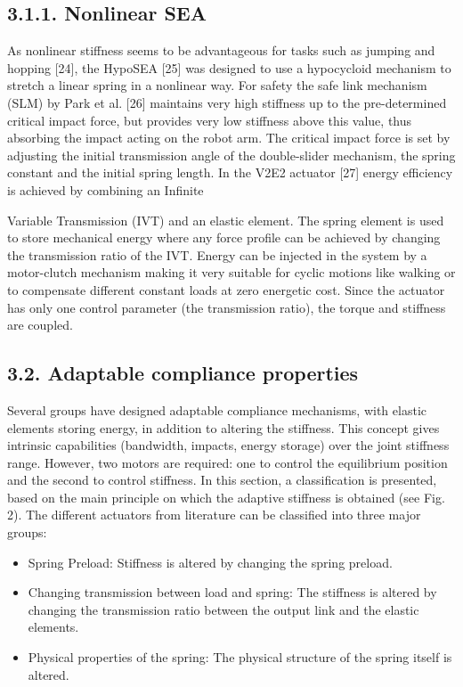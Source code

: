 \documentclass[10pt]{article}
\begin{document}
\subsection*{3.1.1. Nonlinear SEA}
As nonlinear stiffness seems to be advantageous for tasks such as jumping and hopping [24], the HypoSEA [25] was designed to use a hypocycloid mechanism to stretch a linear spring in a nonlinear way. For safety the safe link mechanism (SLM) by Park et al. [26] maintains very high stiffness up to the pre-determined critical impact force, but provides very low stiffness above this value, thus absorbing the impact acting on the robot arm. The critical impact force is set by adjusting the initial transmission angle of the double-slider mechanism, the spring constant and the initial spring length. In the V2E2 actuator [27] energy efficiency is achieved by combining an Infinite

Variable Transmission (IVT) and an elastic element. The spring element is used to store mechanical energy where any force profile can be achieved by changing the transmission ratio of the IVT. Energy can be injected in the system by a motor-clutch mechanism making it very suitable for cyclic motions like walking or to compensate different constant loads at zero energetic cost. Since the actuator has only one control parameter (the transmission ratio), the torque and stiffness are coupled.

\subsection*{3.2. Adaptable compliance properties}
Several groups have designed adaptable compliance mechanisms, with elastic elements storing energy, in addition to altering the stiffness. This concept gives intrinsic capabilities (bandwidth, impacts, energy storage) over the joint stiffness range. However, two motors are required: one to control the equilibrium position and the second to control stiffness. In this section, a classification is presented, based on the main principle on which the adaptive stiffness is obtained (see Fig. 2). The different actuators from literature can be classified into three major groups:

\begin{itemize}
  \item Spring Preload: Stiffness is altered by changing the spring preload.
  \item Changing transmission between load and spring: The stiffness is altered by changing the transmission ratio between the output link and the elastic elements.
  \item Physical properties of the spring: The physical structure of the spring itself is altered.
\end{itemize}
\end{document}
